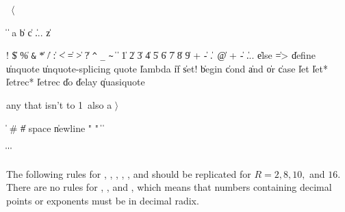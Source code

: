 \label{extendedalphas}
\label{identifiersyntax}

\hbox{\cf{} \goesto{} $\langle$}

\begin{grammar}%
 \:  
 \>  \| 
 \:  \| 
 \: a \| b \| c \| ... \| z

 \: ! \| \$ \| \% \| \verb"&" \| * \| / \| : \| < \| =
 \>  \| > \| ? \| \verb"^" \| \verb"_" \| \verb"~"
 \:  \| 
 \>  \| 
  \| 1 \| 2 \| 3 \| 4 \| 5 \| 6 \| 7 \| 8 \| 9
 \: + \| - \| .\ \| @
 \: + \| - \| ...
 \: 
 \>  \| else \| => \| define 
 \>  \| unquote \| unquote-splicing
 \: quote \| lambda \| if
 \>  \| set! \| begin \| cond \| and \| or \| case
 \>  \| let \| let* \| letrec* \| letrec \| do \| delay
 \>  \| quasiquote

\rm any  that isn't
\hbox to 1\ \rm also a $\rangle$

 \: \schtrue{} \| \schfalse{}
 \: \#\backwhack{} 
 \>  \| \#\backwhack{} 
 \: space \| newline
 \: "  "
 \: 
 \>  \| \backwhack\doublequote{} \| \backwhack\backwhack %
\end{grammar}


\label{numbersyntax}

\begin{grammar}%
 \: %
       \| 
   \>  \| %
       \| 
\end{grammar}

The following rules for , , , , , and 
should be replicated for \hbox{$R = 2, 8, 10,$}
and $16$.  There are no rules for , , and , which means that numbers containing
decimal points or exponents must be in decimal radix.

